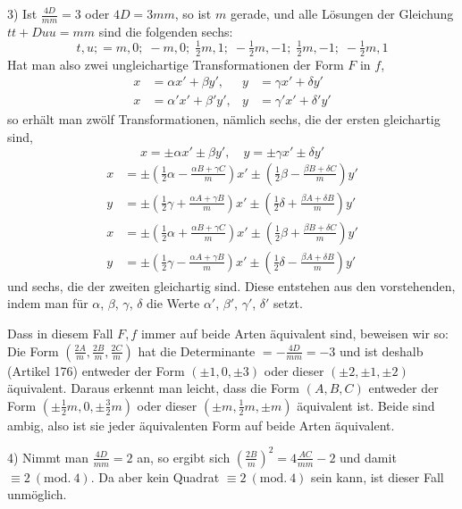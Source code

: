 3) Ist $\frac{4D}{mm}=3$ oder $4D=3mm$, so ist $m$ gerade, und alle Lösungen der Gleichung $tt+Duu=mm$ sind die folgenden sechs:
\[
t,u;=m,0;\;-m,0;\;\tfrac12m,1;\;-\tfrac12m,-1;\;\tfrac12m,-1;\;-\tfrac12m,1
\]
Hat man also zwei ungleichartige Transformationen der Form $F$ in $f$,
\[
\begin{aligned}
x&=\alpha x'+\beta y',& y&=\gamma x'+\delta y'\\
x&=\alpha'x'+\beta'y',& y&=\gamma'x'+\delta'y'
\end{aligned}
\]
so erhält man zwölf Transformationen, nämlich sechs, die der ersten gleichartig sind,
\[
x=\pm\alpha x'\pm\beta y',\quad y=\pm\gamma x'\pm\delta y'
\]
\[
\begin{aligned}
x&=\pm(\tfrac12\alpha-\tfrac{\alpha B+\gamma C}{m})x'\pm(\tfrac12\beta-\tfrac{\beta B+\delta C}{m})y'\\
y&=\pm(\tfrac12\gamma+\tfrac{\alpha A+\gamma B}{m})x'\pm(\tfrac12\delta+\tfrac{\beta A+\delta B}{m})y'
\end{aligned}
\]
\[
\begin{aligned}
x&=\pm(\tfrac12\alpha+\tfrac{\alpha B+\gamma C}{m})x'\pm(\tfrac12\beta+\tfrac{\beta B+\delta C}{m})y'\\
y&=\pm(\tfrac12\gamma-\tfrac{\alpha A+\gamma B}{m})x'\pm(\tfrac12\delta-\tfrac{\beta A+\delta B}{m})y'
\end{aligned}
\]
und sechs, die der zweiten gleichartig sind. Diese entstehen aus den vorstehenden, indem man für $\alpha$, $\beta$, $\gamma$, $\delta$ die Werte $\alpha'$, $\beta'$, $\gamma'$, $\delta'$ setzt.

Dass in diesem Fall $F,f$ immer auf beide Arten äquivalent sind, beweisen wir so: Die Form $(\frac{2A}{m},\frac{2B}{m},\frac{2C}{m})$ hat die Determinante $=-\frac{4D}{mm}=-3$ und ist deshalb (Artikel 176) entweder der Form $(\pm1,0,\pm3)$ oder dieser $(\pm2,\pm1,\pm2)$ äquivalent. Daraus erkennt man leicht, dass die Form $(A,B,C)$ entweder der Form $(\pm\tfrac12m,0,\pm\tfrac32m)$ oder dieser $(\pm m,\tfrac12m,\pm m)$ äquivalent ist. Beide sind ambig, also ist sie jeder äquivalenten Form auf beide Arten äquivalent.

4) Nimmt man $\frac{4D}{mm}=2$ an, so ergibt sich $(\frac{2B}{m})^2=4\frac{AC}{mm}-2$ und damit $\equiv2\ (\mathrm{mod.}\ 4)$.
Da aber kein Quadrat $\equiv2\ (\mathrm{mod.}\ 4)$ sein kann, ist dieser Fall unmöglich.

